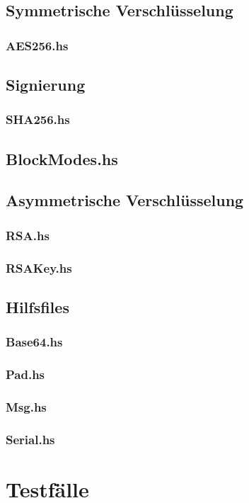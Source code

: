 \documentclass[11pt,a4paper,parskip=half]{scrartcl}
\begin{document}
\subsection{Symmetrische Verschlüsselung}
\subsubsection{AES256.hs}

\subsection{Signierung}
\subsubsection{SHA256.hs}

\subsection{BlockModes.hs}

\subsection{Asymmetrische Verschlüsselung}
\subsubsection{RSA.hs}

\subsubsection{RSAKey.hs}

\subsection{Hilfsfiles}
\subsubsection{Base64.hs}

\subsubsection{Pad.hs}

\subsubsection{Msg.hs}

\subsubsection{Serial.hs}




\section{Testfälle}

\end{document}
